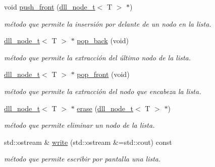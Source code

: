 \begin{DoxyCompactItemize}
void \hyperlink{classdll__t_aa38df54cd7f2a5e60198169a9b4cda26}{push\+\_\+front} (\hyperlink{classdll__node__t}{dll\+\_\+node\+\_\+t}$<$ T $>$ $\ast$)
\begin{DoxyCompactList}\small\item\em método que permite la insersión por delante de un nodo en la lista. \end{DoxyCompactList}\item 
\mbox{\label{classdll__t_a90fffb6ce5603c92c903beede2896e4f}} 
\hyperlink{classdll__node__t}{dll\+\_\+node\+\_\+t}$<$ T $>$ $\ast$ \hyperlink{classdll__t_a90fffb6ce5603c92c903beede2896e4f}{pop\+\_\+back} (void)
\begin{DoxyCompactList}\small\item\em método que permite la extracción del último nodo de la lista. \end{DoxyCompactList}\item 
\mbox{\label{classdll__t_aa4e5e659001f308df220e4e64993ab4b}} 
\hyperlink{classdll__node__t}{dll\+\_\+node\+\_\+t}$<$ T $>$ $\ast$ \hyperlink{classdll__t_aa4e5e659001f308df220e4e64993ab4b}{pop\+\_\+front} (void)
\begin{DoxyCompactList}\small\item\em método que permite la extracción del nodo que encabeza la lista. \end{DoxyCompactList}\item 
\hyperlink{classdll__node__t}{dll\+\_\+node\+\_\+t}$<$ T $>$ $\ast$ \hyperlink{classdll__t_ad75998a73ef06762e317723dae45ae2c}{erase} (\hyperlink{classdll__node__t}{dll\+\_\+node\+\_\+t}$<$ T $>$ $\ast$)
\begin{DoxyCompactList}\small\item\em método que permite eliminar un nodo de la lista. \end{DoxyCompactList}\item 
\mbox{\label{classdll__t_a4e26a362b5235db1323150d7202cc0a1}} 
std\+::ostream \& \hyperlink{classdll__t_a4e26a362b5235db1323150d7202cc0a1}{write} (std\+::ostream \&=std\+::cout) const
\begin{DoxyCompactList}\small\item\em método que permite escribir por pantalla una lista. \end{DoxyCompactList}\end{DoxyCompactItemize}


